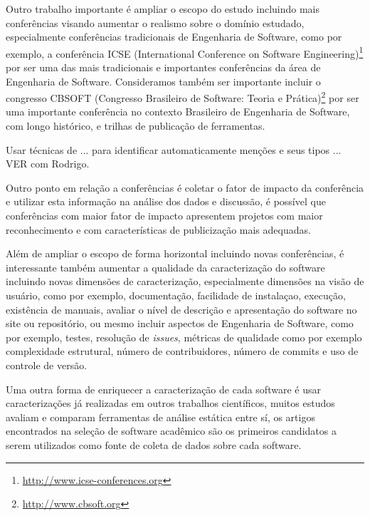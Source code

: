 Outro trabalho importante é ampliar o escopo do estudo incluindo mais
conferências visando aumentar o realismo sobre o domínio estudado,
especialmente conferências tradicionais de Engenharia de Software, como por
exemplo, a conferência ICSE (International Conference on Software
Engineering)\footnote{\url{http://www.icse-conferences.org}} por ser uma das
mais tradicionais e importantes conferências da área de Engenharia de Software.
Consideramos também ser importante incluir o congresso CBSOFT (Congresso
Brasileiro de Software: Teoria e Prática)\footnote{\url{http://www.cbsoft.org}}
por ser uma importante conferência no contexto Brasileiro de Engenharia de
Software, com longo histórico, e trilhas de publicação de ferramentas.

Usar técnicas de ... para identificar automaticamente menções e seus tipos ...
VER com Rodrigo.



Outro ponto em relação a conferências é coletar o fator de impacto da
conferência e utilizar esta informação na análise dos dados e discussão, é
possível que conferências com maior fator de impacto apresentem projetos com
maior reconhecimento e com características de publicização mais adequadas.

Além de ampliar o escopo de forma horizontal incluindo novas conferências, é
interessante também aumentar a qualidade da caracterização do software
incluindo novas dimensões de caracterização, especialmente dimensões na visão
de usuário, como por exemplo, documentação, facilidade de instalaçao, execução,
existência de manuais, avaliar o nível de descrição e apresentação do software
no site ou repositório, ou mesmo incluir aspectos de Engenharia de Software,
como por exemplo, testes, resolução de {\it issues}, métricas de qualidade como
por exemplo complexidade estrutural, número de contribuidores, número de
commits e uso de controle de versão.


Uma outra forma de enriquecer a caracterização de cada software é usar
caracterizações já realizadas em outros trabalhos científicos, muitos estudos
avaliam e comparam ferramentas de análise estática entre sí, os artigos
encontrados na seleção de software acadêmico são os primeiros candidatos a
serem utilizados como fonte de coleta de dados sobre cada software.

